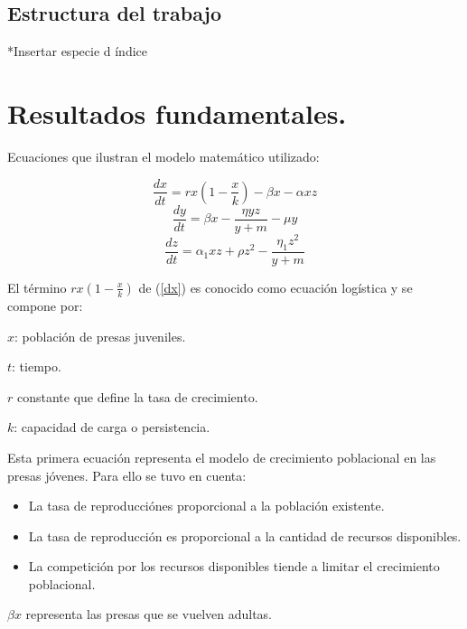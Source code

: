 \documentclass{wscpaperproc}
\theoremstyle{wsc}
\begin{document}
\subsection{Estructura del trabajo}
*Insertar especie d índice

\section{Resultados fundamentales.}


Ecuaciones que ilustran el modelo matemático utilizado:

\begin{equation}\label{dx}
	\frac{dx}{dt} = rx(1-\frac{x}{k})-\beta x-\alpha xz
\end{equation}
\begin{equation}\label{dy}
	\frac{dy}{dt} = \beta x-\frac{\eta yz}{y+m}-\mu y
\end{equation}
\begin{equation}\label{dz}
	\frac{dz}{dt} = \alpha_1 xz+\rho z^2-\frac{\eta_1z^2}{y+m}
\end{equation}

\vspace*{1cm}

El término $rx(1-\frac{x}{k})$ de (\ref*{dx}) es conocido como ecuación
logística y se compone por:
\vspace*{0.3cm}

$x$: población de presas juveniles.

$t$: tiempo.

$r$ constante que define la tasa de crecimiento.

$k$: capacidad de carga o persistencia.

\vspace*{0.5cm}

Esta primera ecuación representa el modelo de crecimiento poblacional en las
presas jóvenes. Para ello se tuvo en cuenta:
\begin{itemize}
	\item La tasa de reproducciónes proporcional a la población existente.
	\item La tasa de reproducción es proporcional a la cantidad de recursos disponibles.
	\item La competición por los recursos disponibles tiende a limitar el crecimiento poblacional.
\end{itemize}

$\beta x$ representa las presas que se vuelven adultas.
\end{document}
